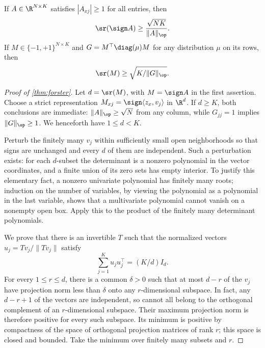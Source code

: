 \begin{theorem}\label{thm:forster}
If $A\in\R^{N\times K}$ satisfies $|A_{xj}|\geq1$ for all entries, then
\begin{equation}\label{eq:forster}
 \sr(\sign A)\geq\frac{\sqrt{NK}}{\|A\|_\op}.
\end{equation}
If $M\in\{-1,+1\}^{N\times K}$ and $G=M^\top\diag(\mu)M$ for any distribution $\mu$ on its rows, then
\begin{equation}\label{eq:weighted}
 \sr(M)\geq\sqrt{K/\|G\|_\op}.
\end{equation}
\end{theorem}

\begin{proof}[Proof of \cref{thm:forster}]
Let $d=\sr(M)$, with $M=\sign A$ in the first assertion. Choose a strict representation
$M_{xj}=\sign\langle z_x,v_j\rangle$ in $\R^d$. If $d\geq K$, both conclusions are immediate: $\|A\|_\op\geq\sqrt N$ from any column, while $G_{jj}=1$ implies $\|G\|_\op\geq1$. We henceforth have $1\leq d<K$.

Perturb the finitely many $v_j$ within sufficiently small open neighborhoods so that signs are unchanged and every $d$ of them are independent. Such a perturbation exists: for each $d$-subset the determinant is a nonzero polynomial in the vector coordinates, and a finite union of its zero sets has empty interior. To justify this elementary fact, a nonzero univariate polynomial has finitely many roots; induction on the number of variables, by viewing the polynomial as a polynomial in the last variable, shows that a multivariate polynomial cannot vanish on a nonempty open box. Apply this to the product of the finitely many determinant polynomials.

We prove that there is an invertible $T$ such that the normalized vectors
$u_j=Tv_j/\|Tv_j\|$ satisfy
\begin{equation}\label{eq:isotropy}
 \sum_{j=1}^K u_ju_j^\top=(K/d)I_d.
\end{equation}
For every $1\leq r\leq d$, there is a common $\delta>0$ such that at most $d-r$ of the $v_j$ have projection norm less than $\delta$ onto any $r$-dimensional subspace. In fact, any $d-r+1$ of the vectors are independent, so cannot all belong to the orthogonal complement of an $r$-dimensional subspace. Their maximum projection norm is therefore positive for every such subspace. Its minimum is positive by compactness of the space of orthogonal projection matrices of rank $r$; this space is closed and bounded. Take the minimum over finitely many subsets and $r$.


\end{proof}
